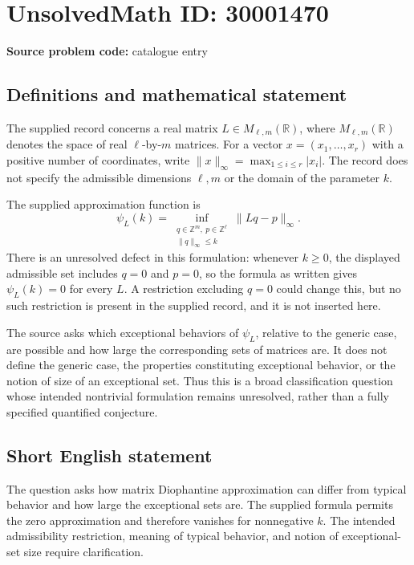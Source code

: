\documentclass[11pt]{article}
\newcommand{\Z}{\mathbb{Z}}
\newcommand{\R}{\mathbb{R}}
\begin{document}
\section*{UnsolvedMath ID: 30001470}
\textbf{Source problem code:} catalogue entry
\subsection{Definitions and mathematical statement}
The supplied record concerns a real matrix \(L\in M_{\ell,m}(\R)\), where \(M_{\ell,m}(\R)\) denotes the space of real \(\ell\)-by-\(m\) matrices. For a vector \(x=(x_1,\ldots,x_r)\) with a positive number of coordinates, write \(\|x\|_\infty=\max_{1\leq i\leq r}|x_i|\). The record does not specify the admissible dimensions \(\ell,m\) or the domain of the parameter \(k\).

The supplied approximation function is
\[
\psi_L(k)=\inf_{\substack{q\in\Z^m,\ p\in\Z^\ell\\ \|q\|_\infty\leq k}}\|Lq-p\|_\infty.
\]
There is an unresolved defect in this formulation: whenever \(k\geq0\), the displayed admissible set includes \(q=0\) and \(p=0\), so the formula as written gives \(\psi_L(k)=0\) for every \(L\). A restriction excluding \(q=0\) could change this, but no such restriction is present in the supplied record, and it is not inserted here.

The source asks which exceptional behaviors of \(\psi_L\), relative to the generic case, are possible and how large the corresponding sets of matrices are. It does not define the generic case, the properties constituting exceptional behavior, or the notion of size of an exceptional set. Thus this is a broad classification question whose intended nontrivial formulation remains unresolved, rather than a fully specified quantified conjecture.
\subsection{Short English statement}
The question asks how matrix Diophantine approximation can differ from typical behavior and how large the exceptional sets are. The supplied formula permits the zero approximation and therefore vanishes for nonnegative \(k\). The intended admissibility restriction, meaning of typical behavior, and notion of exceptional-set size require clarification.
\end{document}
